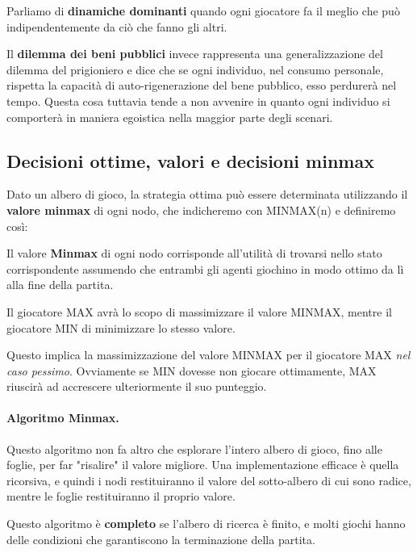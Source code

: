         Parliamo di \textbf{dinamiche dominanti} quando ogni giocatore fa il meglio che può indipendentemente da ciò che fanno gli altri.
        
        Il \textbf{dilemma dei beni pubblici} invece rappresenta una generalizzazione del dilemma del prigioniero e dice che se ogni individuo, nel consumo personale, rispetta la capacità di auto-rigenerazione del bene pubblico, esso perdurerà nel tempo. Questa cosa tuttavia tende a non avvenire in quanto ogni individuo si comporterà in maniera egoistica nella maggior parte degli scenari.
        
    \subsection{Decisioni ottime, valori e decisioni minmax}
        Dato un albero di gioco, la strategia ottima può essere determinata utilizzando il \textbf{valore minmax} di ogni nodo, che indicheremo con MINMAX(n) e definiremo così:
        \begin{center}
            Il valore \textbf{Minmax} di ogni nodo corrisponde all'utilità di trovarsi \newline nello stato corrispondente assumendo che entrambi gli agenti giochino in \newline modo ottimo da lì alla fine della partita.
        \end{center}
        
        Il giocatore MAX avrà lo scopo di massimizzare il valore MINMAX, mentre il giocatore MIN di minimizzare lo stesso valore.
        
        Questo implica la massimizzazione del valore MINMAX per il giocatore MAX \textit{nel caso pessimo}. Ovviamente se MIN dovesse non giocare ottimamente, MAX riuscirà ad accrescere ulteriormente il suo punteggio.
        
        \paragraph{Algoritmo Minmax.} Questo algoritmo non fa altro che esplorare l'intero albero di gioco, fino alle foglie, per far "risalire" il valore migliore. Una implementazione efficace è quella ricorsiva, e quindi i nodi restituiranno il valore del sotto-albero di cui sono radice, mentre le foglie restituiranno il proprio valore.
        
        Questo algoritmo è \textbf{completo} se l'albero di ricerca è finito, e molti giochi hanno delle condizioni che garantiscono la terminazione della partita.
        
